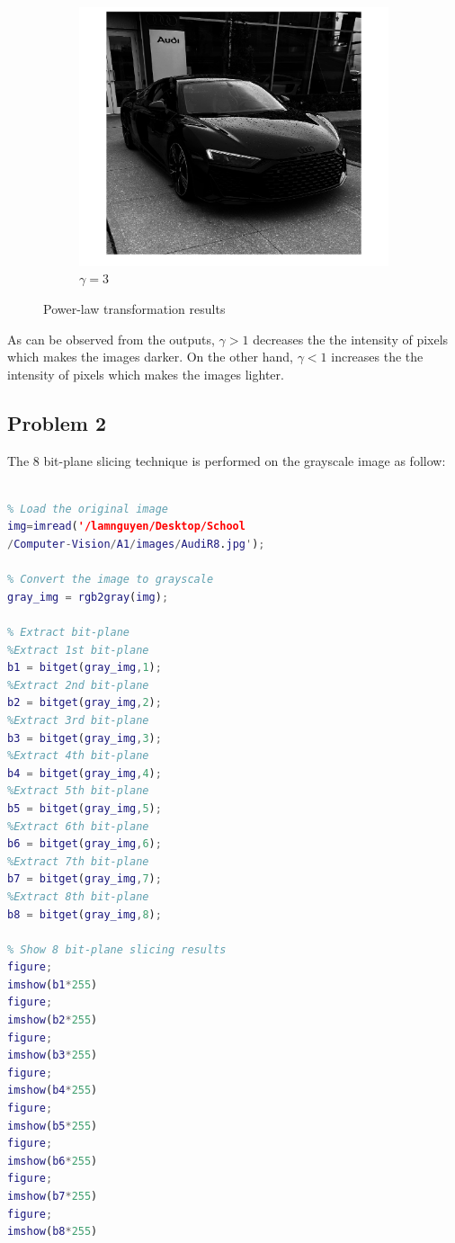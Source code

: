 \documentclass[conference]{IEEEtran}
\begin{document}
\begin{figure}[h!]
\begin{subfigure}[b]{0.3\linewidth}
\includegraphics[width=\linewidth]{images/img3.jpg}
\caption{\(\gamma = 3\)}
\end{subfigure}
\caption{Power-law transformation results}
\label{fig:power-law transformation}
\end{figure}

As can be observed from the outputs, \(\gamma > 1\) decreases the the intensity of pixels which makes the images darker. On the other hand, \(\gamma < 1\) increases the the intensity of pixels which makes the images lighter.

\newpage

\subsection{Problem 2}

The 8 bit-plane slicing technique is performed on the grayscale image as follow: 

\begin{lstlisting}[language=Matlab]

% Load the original image
img=imread('/lamnguyen/Desktop/School
/Computer-Vision/A1/images/AudiR8.jpg');

% Convert the image to grayscale
gray_img = rgb2gray(img);

% Extract bit-plane
%Extract 1st bit-plane
b1 = bitget(gray_img,1); 
%Extract 2nd bit-plane
b2 = bitget(gray_img,2); 
%Extract 3rd bit-plane
b3 = bitget(gray_img,3); 
%Extract 4th bit-plane
b4 = bitget(gray_img,4); 
%Extract 5th bit-plane
b5 = bitget(gray_img,5); 
%Extract 6th bit-plane
b6 = bitget(gray_img,6); 
%Extract 7th bit-plane
b7 = bitget(gray_img,7); 
%Extract 8th bit-plane
b8 = bitget(gray_img,8);

% Show 8 bit-plane slicing results
figure;
imshow(b1*255)
figure;
imshow(b2*255)
figure;
imshow(b3*255)
figure;
imshow(b4*255)
figure;
imshow(b5*255)
figure;
imshow(b6*255)
figure;
imshow(b7*255)
figure; 
imshow(b8*255)

\end{lstlisting}
\end{document}
